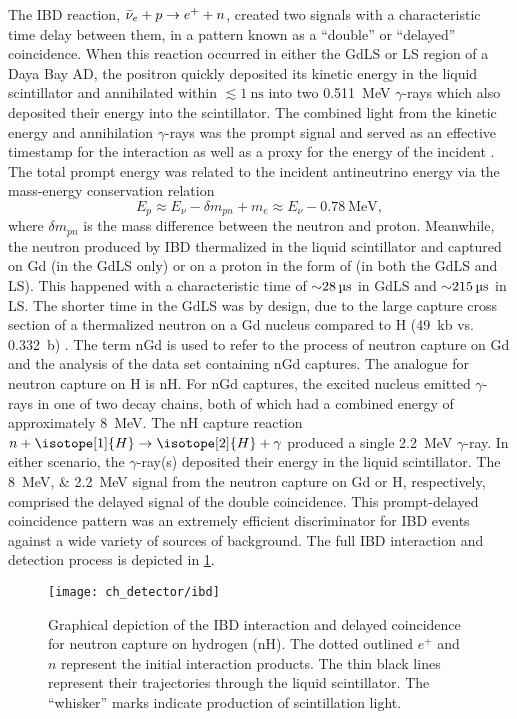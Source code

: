 The IBD reaction, $\bar{\nu}_e + p \to e^+ + n$,
created two signals with a characteristic
time delay between them, in a pattern known as a ``double''
or ``delayed'' coincidence.
When this reaction occurred in either the GdLS or LS region
of a Daya Bay AD,
the positron quickly deposited its kinetic energy in the liquid scintillator
and annihilated within $\lesssim\SI{1}{\nano\second}$
into two \SI{0.511}{\MeV} $\gamma$-rays
which also deposited their energy into the scintillator.
The combined light from the kinetic energy and annihilation $\gamma$-rays
was the prompt signal
and served as an effective timestamp for the interaction
as well as a proxy for the energy of the incident \nuebar{}.
The total prompt energy was related to the incident antineutrino energy
via the mass-energy conservation relation
\begin{equation}\label{eq:prompt_vs_nu_energy}
    E_p \approx E_\nu - \delta m_{pn} + m_e \approx E_\nu - \SI{0.78}{\MeV},
\end{equation}
where $\delta m_{pn}$ is the mass difference between the neutron and proton.
Meanwhile, the neutron produced by IBD thermalized in the liquid scintillator
and captured on Gd (in the GdLS only) or on a proton in the form of 
(in both the GdLS and LS).
This happened with a characteristic time of $\SI{\sim28}{\us}$
in GdLS and $\SI{\sim215}{\us}$ in LS.
The shorter time in the GdLS was by design,
due to the large capture cross section of a thermalized neutron
on a Gd nucleus compared to H (\SI{49}{\kilo\barn} vs. \SI{0.332}{\barn})
\cite{gdls2014}.
The term nGd is used to refer to the process of neutron capture on Gd
and the analysis of the data set containing nGd captures.
The analogue for neutron capture on H is nH.
For nGd captures, the excited nucleus
emitted $\gamma$-rays in one of two decay chains,
both of which had a combined energy of approximately \SI{8}{\MeV}.
The nH capture reaction $n+\isotope[1]{H} \to \isotope[2]{H} + \gamma$
produced a single \SI{2.2}{\MeV} $\gamma$-ray.
In either scenario, the $\gamma$-ray(s) deposited their energy
in the liquid scintillator.
The \SIlist[list-pair-separator = { or }]{8;2.2}{\MeV} signal
from the neutron capture on Gd or H, respectively, comprised the delayed signal of the
double coincidence.
This prompt-delayed coincidence pattern was an extremely efficient
discriminator for IBD events against a wide variety of sources of background.
The full IBD interaction and detection process
is depicted in \cref{fig:ibd_cartoon}.

\begin{figure}
    \centering
    \texttt{[image: ch\_detector/ibd]}
    \caption[Inverse Beta Decay diagram]{
        Graphical depiction of the IBD interaction and delayed coincidence
        for neutron capture on hydrogen (nH).
        The dotted outlined $e^+$ and $n$ represent the initial interaction products.
        The thin black lines represent their trajectories
        through the liquid scintillator.
        The ``whisker'' marks indicate production of scintillation light.
    }
    \label{fig:ibd_cartoon}
\end{figure}

